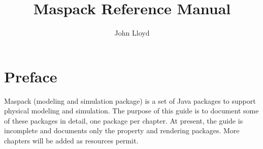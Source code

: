 \documentclass{book}
\title{Maspack Reference Manual}
\author{John Lloyd}
\date{}
\begin{document}
\frontmatter

\maketitle

\iflatexml{\large\pubdate}\fi

\tableofcontents

\chapter*{Preface}

Maspack (modeling and simulation package) is a set of Java packages to
support physical modeling and simulation. The purpose of this guide is
to document some of these packages in detail, one package per
chapter. At present, the guide is incomplete and documents only the
property and rendering packages. More chapters will be added as
resources permit.

\mainmatter



\end{document}
